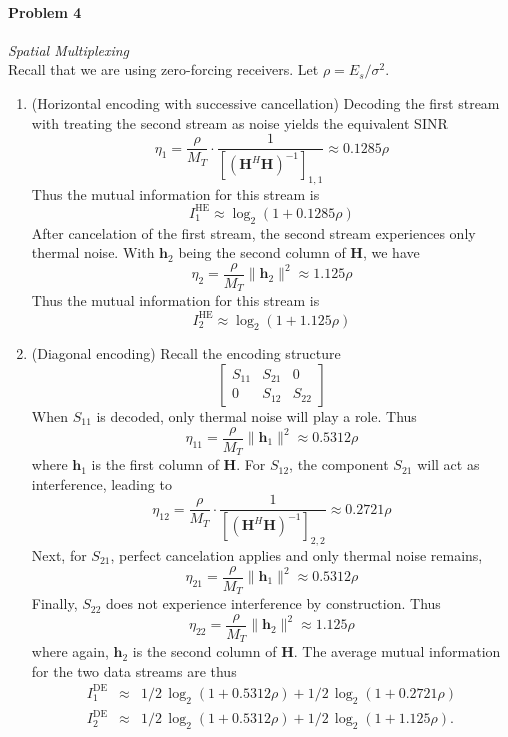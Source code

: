 \documentclass[12pt]{article}
\begin{document}
\paragraph{Problem 4} {\it Spatial Multiplexing} \\
Recall that we are using zero-forcing receivers. Let $\rho = E_s /  \sigma^2$.
\begin{enumerate}
\item (Horizontal encoding with successive cancellation) Decoding the  first stream with treating the second stream as noise yields the equivalent SINR
$$
	\eta_1 = \frac{ \rho} {M_T} \cdot \frac{1}{[(\mathbf H^H \mathbf H)^{-1}]_{1,1}} \approx 0.1285 \rho
$$
Thus the mutual information for this stream is
$$
	I_1^\text{HE} \approx  \log_2(1+ 0.1285 \rho )
$$
After cancelation of the first stream, the second stream experiences only thermal noise. With $\mathbf h_2$ being the second column of $\mathbf H$, we have
$$
	\eta_2 = \frac{ \rho} {M_T} \lVert \mathbf h_2 \rVert^2 \approx 1.125 \rho
$$
Thus the mutual information for this stream is
$$
	I_2^\text{HE} \approx  \log_2(1+ 1.125 \rho )
$$
 
\item (Diagonal encoding) Recall the encoding structure
$$
\left[ \begin{array}{ccc}
S_{11} & S_{21} & 0\\
0 & S_{12} & S_{22}
\end{array} \right ]
$$
When $S_{11}$ is decoded, only thermal noise will play a role. Thus
$$
	\eta_{11} =  \frac{ \rho} {M_T} \lVert \mathbf h_1 \rVert^2 \approx 0.5312 \rho
$$ 
where $\mathbf h_1$ is the first column of $\mathbf H$.
For $S_{12}$, the component $S_{21}$ will act as interference, leading to 
$$
	\eta_{12} = \frac{ \rho} {M_T} \cdot \frac{1}{[(\mathbf H^H \mathbf H)^{-1}]_{2,2}} \approx 0.2721 \rho
$$
Next, for $S_{21}$, perfect cancelation applies and only thermal noise remains,
$$
	\eta_{21} =  \frac{ \rho} {M_T} \lVert \mathbf h_1 \rVert^2 \approx 0.5312 \rho
$$ 
Finally, $S_{22}$ does not experience interference by construction. Thus
$$
	\eta_{22} =  \frac{ \rho} {M_T} \lVert \mathbf h_2 \rVert^2 \approx 1.125 \rho
$$
where again, $\mathbf h_2$ is the second column of $\mathbf H$.
The average mutual information for the two data streams are thus
\begin{eqnarray*}
	I_1^\text{DE} &\approx &  1/2 \, \log_2(1+ 0.5312 \rho ) +1/2 \, \log_2(1+ 0.2721 \rho ) \\
	I_2^\text{DE} &\approx & 1/2 \, \log_2(1+ 0.5312 \rho ) +1/2 \, \log_2(1+ 1.125 \rho ).
\end{eqnarray*}

\end{enumerate}
\end{document}
